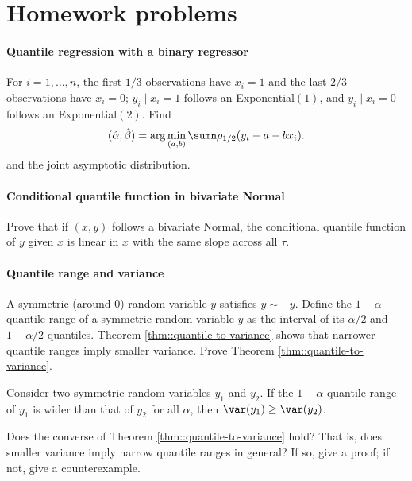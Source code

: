 \section{Homework problems}
 
 

\paragraph{Quantile regression with a binary regressor}\label{hw22::qr-binaryx}

For $i=1,\ldots, n$, the first $1/3$ observations have $x_i=1$ and the last $2/3$ observations have $x_i=0$;
$y_i\mid x_i =1$ follows an Exponential$(1)$, and $y_i\mid x_i = 0 $ follows an Exponential$(2)$. Find
$$
(\hat{\alpha}, \hat{\beta})  = \arg\min_{(a,b)} \sumn \rho_{1/2}(y_i - a - b x_i).
$$
and the joint asymptotic distribution. 




\paragraph{Conditional quantile function in bivariate Normal}\label{hw22::qr-bivariate-Normal}

Prove that if $(x,y)$ follows a bivariate Normal, the conditional quantile function of $y$ given $x$ is linear in $x$ with the same slope across all $\tau$. 

\paragraph{Quantile range and variance}\label{hw22::quantile-range-variance}

A symmetric (around 0) random variable $y$ satisfies $y \sim -y$. 
Define the $1-\alpha$ quantile range of a symmetric random variable $y$ as the interval of its $\alpha/2$  and $1-\alpha/2$ quantiles.
Theorem \ref{thm::quantile-to-variance} shows that narrower quantile ranges imply smaller variance. Prove Theorem \ref{thm::quantile-to-variance}. 


\begin{theorem}
\label{thm::quantile-to-variance}
Consider two symmetric random variables $y_1$ and $y_2$.
If the $1-\alpha$ quantile range of $y_1$ is wider than that of $y_2$ for all $\alpha$, then $\var(y_1) \geq \var(y_2)$.
\end{theorem}

 
Does the converse of Theorem \ref{thm::quantile-to-variance} hold? That is, does smaller variance imply narrow quantile ranges in general? If so, give a proof; if not, give a counterexample. 




